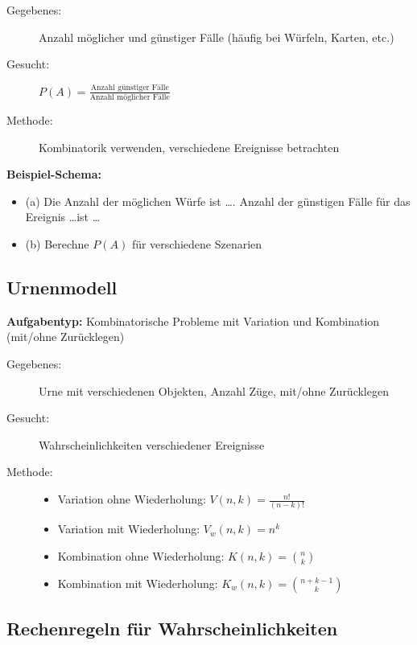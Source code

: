 \documentclass[12pt, a4paper, titlepage, ngerman]{scrartcl}
\begin{document}
\begin{description}
  \item[Gegebenes:] Anzahl möglicher und günstiger Fälle (häufig bei Würfeln, Karten, etc.)
  \item[Gesucht:] $P(A) = \frac{\text{Anzahl günstiger Fälle}}{\text{Anzahl möglicher Fälle}}$
  \item[Methode:] Kombinatorik verwenden, verschiedene Ereignisse betrachten
\end{description}

\medskip

\textbf{Beispiel-Schema:}
\begin{itemize}
  \item (a) Die Anzahl der möglichen Würfe ist \ldots. Anzahl der günstigen Fälle für das Ereignis \ldots ist \ldots
  \item (b) Berechne $P(A)$ für verschiedene Szenarien
\end{itemize}

\subsection{Urnenmodell}

\textbf{Aufgabentyp:} Kombinatorische Probleme mit Variation und Kombination (mit/ohne Zurücklegen)

\begin{description}
  \item[Gegebenes:] Urne mit verschiedenen Objekten, Anzahl Züge, mit/ohne Zurücklegen
  \item[Gesucht:] Wahrscheinlichkeiten verschiedener Ereignisse
  \item[Methode:] 
    \begin{itemize}
      \item Variation ohne Wiederholung: $V(n,k) = \frac{n!}{(n-k)!}$
      \item Variation mit Wiederholung: $V_w(n,k) = n^k$
      \item Kombination ohne Wiederholung: $K(n,k) = \binom{n}{k}$
      \item Kombination mit Wiederholung: $K_w(n,k) = \binom{n+k-1}{k}$
    \end{itemize}
\end{description}

\subsection{Rechenregeln für Wahrscheinlichkeiten}
\end{document}
